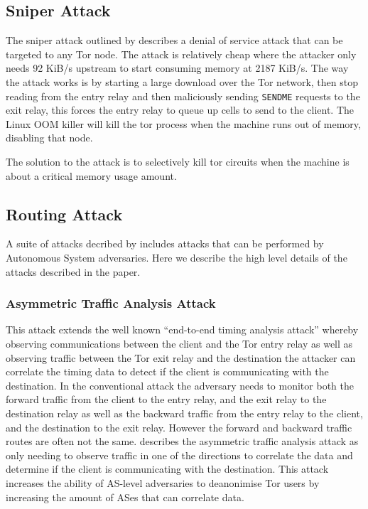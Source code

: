 \documentclass[9pt,technote]{IEEEtran}
\begin{document}
\subsection{Sniper Attack}
The sniper attack outlined by \citeauthor{jansen2014sniper} describes a denial
of service attack that can be targeted to any Tor node. The attack is relatively cheap where the attacker only needs 92 KiB/s upstream to start consuming memory at 2187 KiB/s. The way the attack works is by starting a large download over the Tor network, then stop reading from the entry relay and then maliciously sending \texttt{SENDME} requests to the exit relay, this forces the entry relay to queue up cells to send to the client. The Linux OOM killer will kill the tor process when the machine runs out of memory, disabling that node.

The solution to the attack is to selectively kill tor circuits when the machine
is about a critical memory usage amount.

\subsection{Routing Attack}
A suite of attacks decribed by \citeauthor{sun2015raptor} includes attacks that
can be performed by Autonomous System adversaries. Here we describe the high
level details of the attacks described in the paper.
\subsubsection{Asymmetric Traffic Analysis Attack}
This attack extends the well known ``end-to-end timing analysis attack'' whereby
observing communications between the client and the Tor entry relay as well as
observing traffic between the Tor exit relay and the destination the attacker
can correlate the timing data to detect if the client is communicating with the
destination. In the conventional attack the adversary needs to monitor both the
forward traffic from the client to the entry relay, and the exit relay to the
destination relay as well as the backward traffic from the entry relay to the
client, and the destination to the exit relay. However the forward and backward
traffic routes are often not the same. \citeauthor{sun2015raptor} describes the
asymmetric traffic analysis attack as only needing to observe traffic in one of
the directions to correlate the data and determine if the client is
communicating with the destination. This attack increases the ability of
AS-level adversaries to deanonimise Tor users by increasing the amount of ASes
that can correlate data.
\end{document}
